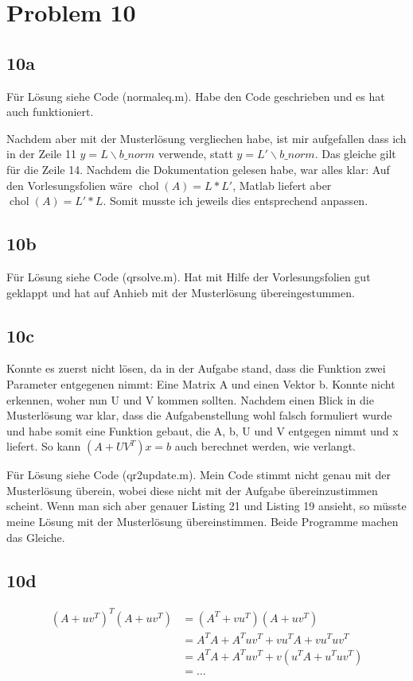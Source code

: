 \documentclass[11pt]{article}
\begin{document}
\section{Problem 10}
\subsection{10a}
Für Lösung siehe Code (normaleq.m).
Habe den Code geschrieben und es hat auch funktioniert.

Nachdem aber mit der Musterlösung vergliechen habe, ist mir aufgefallen dass ich in der Zeile 11 $y = L \backslash b\_norm$ verwende, statt $y = L' \backslash b\_norm$. Das gleiche gilt für die Zeile 14. Nachdem die Dokumentation gelesen habe, war alles klar: Auf den Vorlesungsfolien wäre $\operatorname{chol}(A) = L * L'$, Matlab liefert aber $\operatorname{chol}(A) = L' * L$. Somit musste ich jeweils dies entsprechend anpassen.

\subsection{10b}
Für Lösung siehe Code (qrsolve.m). Hat mit Hilfe der Vorlesungsfolien gut geklappt und hat auf Anhieb mit der Musterlösung übereingestummen.

\subsection{10c}
Konnte es zuerst nicht lösen, da in der Aufgabe stand, dass die Funktion zwei Parameter entgegenen nimmt: Eine Matrix A und einen Vektor b. Konnte nicht erkennen, woher nun U und V kommen sollten. Nachdem einen Blick in die Musterlösung war klar, dass die Aufgabenstellung wohl falsch formuliert wurde und habe somit eine Funktion gebaut, die A, b, U und V entgegen nimmt und x liefert. So kann $(A + UV^T)x = b$ auch berechnet werden, wie verlangt.

Für Lösung siehe Code (qr2update.m). Mein Code stimmt nicht genau mit der Musterlösung überein, wobei diese nicht mit der Aufgabe übereinzustimmen scheint. Wenn man sich aber genauer Listing 21 und Listing 19 ansieht, so müsste meine Lösung mit der Musterlösung übereinstimmen. Beide Programme machen das Gleiche.

\subsection{10d}
\begin{align*}
(A + uv^T)^T(A + uv^T) &= (A^T + vu^T)(A + uv^T)\\
&= A^T A + A^T uv^T + vu^T A + v u^T u v^T\\
&= A^T A + A^T uv^T + v(u^T A + u^T u v^T)\\
&= \ldots
\end{align*}
\end{document}
